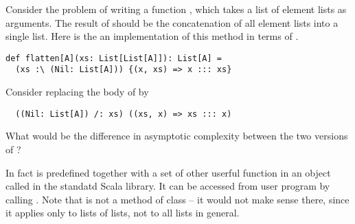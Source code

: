 \begin{exercise} Consider the problem of writing a function ,
which takes a list of element lists as arguments. The result of
 should be the concatenation of all element lists into a
single list. Here is the an implementation of this method in terms of 
\code{:\\}.
\begin{lstlisting}
def flatten[A](xs: List[List[A]]): List[A] =
  (xs :\ (Nil: List[A])) {(x, xs) => x ::: xs}
\end{lstlisting} 
Consider replacing the body of \lstinline@flatten@
by 
\begin{lstlisting}
  ((Nil: List[A]) /: xs) ((xs, x) => xs ::: x)
\end{lstlisting}
What would be the difference in asymptotic
complexity between the two versions of \lstinline@flatten@?

In fact  is predefined together with a set of other
userful function in an object called  in the standatd Scala
library. It can be accessed from user program by calling
. Note that  is not a method of class
 -- it would not make sense there, since it applies only
to lists of lists, not to all lists in general.
\end{exercise}

